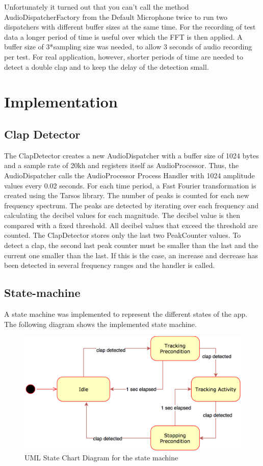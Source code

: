 Unfortunately it turned out that you can't call the method
AudioDispatcherFactory from the Default Microphone twice to run two dispatchers with
different buffer sizes at the same time. For the recording of test data a longer
period of time is useful over which the FFT is then applied. A buffer size of
3*sampling size was needed, to allow 3 seconds of audio recording per test. For
real application, however, shorter periods of time are needed to detect a double
clap and to keep the delay of the detection small.


\section{Implementation}
\label{sec:org7c927b3}
\subsection{Clap Detector}

The ClapDetector creates a new AudioDispatcher with a buffer size of 1024 bytes and a sample rate of 20kh and registers itself as AudioProcessor.
Thus, the AudioDispatcher calls the AudioProcessor Process Handler with 1024 amplitude values every 0.02 seconds.
For each time period, a Fast Fourier transformation is created using the Tarsos library. The number of peaks is counted for each new frequency spectrum.
The peaks are detected by iterating over each frequency and calculating the decibel values for each magnitude. The decibel value is then compared with a fixed threshold.
All decibel values that exceed the threshold are counted. The ClapDetector stores only the last two PeakCounter values.
To detect a clap, the second last peak counter must be smaller than the last and the current one smaller than the last.
If this is the case, an increase and decrease has been detected in several frequency ranges and the handler is called.


\subsection{State-machine}
\label{sec:orgd3a5b2d}
A state machine was implemented to represent the different states of the app.
The following diagram shows the implemented state machine.

\begin{figure}[H]
	\centering
	\includegraphics[width=1.0\linewidth]{./imgs/statemachine.png}
	\caption[Caption for LOF]{UML State Chart Diagram for the state machine}
	\label{statemachine}
\end{figure}

